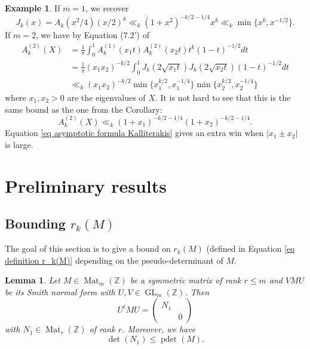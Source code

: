 \documentclass[oneside]{amsart}
\numberwithin{equation}{section}
\newtheorem{lemma}[theorem]{Lemma}
\theoremstyle{definition}
\newtheorem{example}[theorem]{Example}
\theoremstyle{remark}
\theoremstyle{remark}
\newcommand{\ZZ}{\mathbb Z}
\newcommand{\abs}[1]{\left\lvert #1\right\rvert}
\DeclareMathOperator{\Mat}{Mat}
\DeclareMathOperator{\GL}{GL}
\DeclareMathOperator{\pdet}{pdet}
\newcommand{\pmatrixtwo}[4]{\begin{pmatrix}#1&#2\\#3&#4\end{pmatrix}}
\begin{document}
\begin{example}
If $m=1$, we recover
$$J_k(x)=A_k(x^2/4)(x/2)^k\ll_k(1+x^2)^{-k/2-1/4}x^k\ll_k\min\{x^k,x^{-1/2}\}.$$
If $m=2$, we have by Equation (7.2') of \cite{Her55}
\begin{align*}
A_k^{(2)}(X)&=\frac1\pi\int_0^1A_k^{(1)}(x_1t)A_k^{(2)}(x_2t)t^k(1-t)^{-1/2}dt\\
	&=\frac1\pi(x_1x_2)^{-k/2}\int_0^1J_k(2\sqrt{x_1t})J_k(2\sqrt{x_2t})(1-t)^{-1/2}dt\\
	&\ll_k(x_1x_2)^{-k/2}\min\{x_1^{k/2},x_1^{-1/4}\}\min\{x_2^{k/2},x_2^{-1/4}\}
\end{align*}
where $x_1,x_2>0$ are the eigenvalues of $X$. It is not hard to see that this is the same bound as the one from the Corollary:
$$A_k^{(2)}(X)\ll_k(1+x_1)^{-k/2-1/4}(1+x_2)^{-k/2-1/4}.$$
Equation \eqref{eq asymptotic formula Kalliterakis} gives an extra win when $\abs{x_1\pm x_2}$ is large.
\end{example}



\section{Preliminary results}\label{sec preliminaries}

\subsection{Bounding \texorpdfstring{$r_k(M)$}{rₖ(N)}}

The goal of this section is to give a bound on $r_k(M)$ (defined in Equation \eqref{eq definition r_k(M)} depending on the pseudo-determinant of $M$.

\begin{lemma}\label{lem congruence of symmetric matrix}
Let $M\in\Mat_m(\ZZ)$ be a symmetric matrix of rank $r\leq m$ and $VMU$ be its Smith normal form with $U,V\in\GL_m(\ZZ)$. Then
$$U^tMU=\pmatrixtwo{N_1}{}{}{0}$$
with $N_1\in\Mat_r(\ZZ)$ of rank $r$. Moreover, we have
$$\det(N_1)\leq\pdet(M).$$
\end{lemma}
\end{document}
